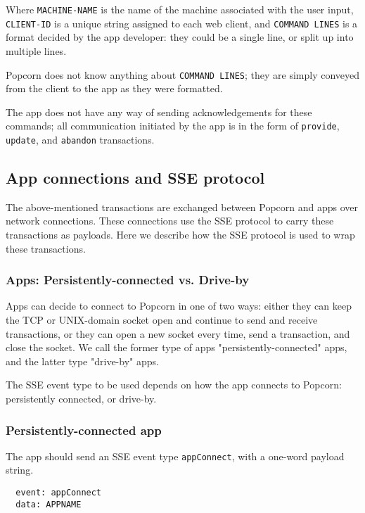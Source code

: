 \documentclass[12pt]{article}
\begin{document}
Where \verb`MACHINE-NAME` is the name of the machine associated with the
user input, \verb`CLIENT-ID` is a unique string assigned to each web
client, and \verb`COMMAND LINES` is a format decided by the app developer:
they could be a single line, or split up into multiple lines.

Popcorn does not know anything about \verb`COMMAND LINES`; they are simply
conveyed from the client to the app as they were formatted.

The app does not have any way of sending acknowledgements for these
commands; all communication initiated by the app is in the form of
\verb`provide`, \verb`update`, and \verb`abandon` transactions.


\subsection{App connections and SSE protocol}

The above-mentioned transactions are exchanged between Popcorn and
apps over network connections. These connections use the SSE protocol
to carry these transactions as payloads. Here we describe how the SSE
protocol is used to wrap these transactions.

\subsubsection{Apps: Persistently-connected vs. Drive-by}

Apps can decide to connect to Popcorn in one of two ways: either they
can keep the TCP or UNIX-domain socket open and continue to send and
receive transactions, or they can open a new socket every time, send a
transaction, and close the socket. We call the former type of apps
"persistently-connected" apps, and the latter type "drive-by" apps.

The SSE event type to be used depends on how the app connects to
Popcorn: persistently connected, or drive-by.

\subsubsection{Persistently-connected app}

The app should send an SSE event type \verb`appConnect`, with a one-word
payload string.

\begin{verbatim}
  event: appConnect
  data: APPNAME
\end{verbatim}
\end{document}
